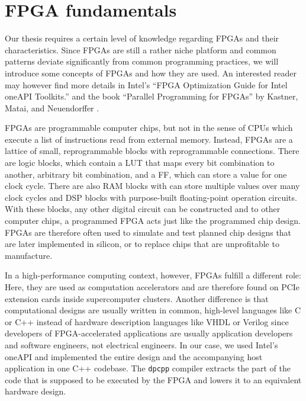 \begin{example}
    \begin{center}
    \end{center}
\end{example}

\section{FPGA fundamentals}

Our thesis requires a certain level of knowledge regarding \acp{FPGA} and their characteristics. Since \acp{FPGA} are still a rather niche platform and common patterns deviate significantly from common programming practices, we will introduce some concepts of \acp{FPGA} and how they are used. An interested reader may however find more details in Intel's ``\ac{FPGA} Optimization Guide for Intel oneAPI Toolkits.'' and the book ``Parallel Programming for \acp{FPGA}'' by Kastner, Matai, and Neuendorffer \cite{2018arXiv180503648K}.

\acfp{FPGA} are programmable computer chips, but not in the sense of \acp{CPU} which execute a list of instructions read from external memory. Instead, \acp{FPGA} are a lattice of small, reprogrammable blocks with reprogrammable connections. There are logic blocks, which contain a \acf{LUT} that maps every bit combination to another, arbitrary bit combination, and a \acf{FF}, which can store a value for one clock cycle. There are also \acf{RAM} blocks with can store multiple values over many clock cycles and \ac{DSP} blocks with purpose-built floating-point operation circuits. With these blocks, any other digital circuit can be constructed and to other computer chips, a programmed \ac{FPGA} acts just like the programmed chip design. \acp{FPGA} are therefore often used to simulate and test planned chip designs that are later implemented in silicon, or to replace chips that are unprofitable to manufacture.

In a high-performance computing context, however, \acp{FPGA} fulfill a different role: Here, they are used as computation accelerators and are therefore found on PCIe extension cards inside supercomputer clusters. Another difference is that computational designs are usually written in common, high-level languages like C or C++ instead of hardware description languages like VHDL or Verilog since developers of \ac{FPGA}-accelerated applications are usually application developers and software engineers, not electrical engineers. In our case, we used Intel's oneAPI and implemented the entire design and the accompanying host application in one C++ codebase. The \texttt{dpcpp} compiler extracts the part of the code that is supposed to be executed by the \ac{FPGA} and lowers it to an equivalent hardware design. 


